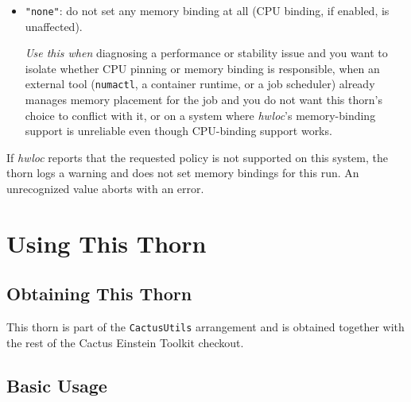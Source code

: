 \begin{itemize}
  \emph{Use this when} a particular allocation is genuinely read (or
  written) roughly equally by threads across multiple NUMA nodes, so no
  single ``local'' placement is meaningful -- for example, a large
  equation-of-state or interpolation table shared by all threads on a
  host. Interleaving spreads the aggregate memory-bandwidth demand
  across all memory controllers on the node instead of concentrating it
  on one, which would otherwise become a bottleneck (and would not
  actually be ``local'' to most of the threads hammering it anyway).
  This is a niche choice, not appropriate for the bulk of
  per-thread grid-function storage.
\item \texttt{"none"}: do not set any memory binding at all (CPU
  binding, if enabled, is unaffected).

  \emph{Use this when} diagnosing a performance or stability issue and
  you want to isolate whether CPU pinning or memory binding is
  responsible, when an external tool (\texttt{numactl}, a container
  runtime, or a job scheduler) already manages memory placement for the
  job and you do not want this thorn's choice to conflict with it, or
  on a system where \emph{hwloc}'s memory-binding support is unreliable
  even though CPU-binding support works.
\end{itemize}
If \emph{hwloc} reports that the requested policy is not supported on
this system, the thorn logs a warning and does not set memory bindings
for this run. An unrecognized value aborts with an error.

\section{Using This Thorn}

\subsection{Obtaining This Thorn}

This thorn is part of the \texttt{CactusUtils} arrangement and is
obtained together with the rest of the Cactus Einstein Toolkit
checkout.

\subsection{Basic Usage}

